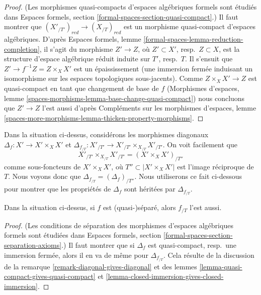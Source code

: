 \begin{proof}
(Les morphismes quasi-compacts d'espaces algébriques formels sont étudiés dans
Espaces formels, section \ref{formal-spaces-section-quasi-compact}.)
Il faut montrer que $(X'_{/T'})_{red} \to (X_{/T})_{red}$ est un morphisme
quasi-compact d'espaces algébriques. D'après
Espaces formels, lemme \ref{formal-spaces-lemma-reduction-completion},
il s'agit du morphisme $Z' \to Z$, où $Z' \subset X'$, resp.\ $Z \subset X$,
est la structure d'espace algébrique réduit induite sur $T'$, resp.\ $T$.
Il s'ensuit que $Z' \to f^{-1}Z = Z \times_X X'$ est un épaississement
(une immersion fermée induisant un isomorphisme sur les espaces topologiques
sous-jacents). Comme $Z \times_X X' \to Z$ est quasi-compact en tant que
changement de base de $f$ (Morphismes d'espaces, lemme
\ref{spaces-morphisms-lemma-base-change-quasi-compact})
nous concluons que $Z' \to Z$ l'est aussi d'après
Compléments sur les morphismes d'espaces, lemme
\ref{spaces-more-morphisms-lemma-thicken-property-morphisms}.
\end{proof}

\begin{remark}
\label{remark-diagonal-gives-diagonal}
Dans la situation ci-dessus, considérons les morphismes diagonaux
$\Delta_f : X' \to X' \times_X X'$ et
$\Delta_{f_{/T}} : X'_{/T'} \to X'_{/T'} \times_{X_{/T}} X'_{/T'}$.
On voit facilement que
$$
X'_{/T'} \times_{X_{/T}} X'_{/T'} = (X' \times_X X')_{/T''}
$$
comme sous-foncteurs de $X' \times_X X'$, où $T'' \subset |X' \times_X X'|$
est l'image réciproque de $T$. Nous voyons donc que
$\Delta_{f_{/T}} = (\Delta_f)_{/T''}$. Nous utiliserons ce fait ci-dessous
pour montrer que les propriétés de $\Delta_f$ sont héritées par $\Delta_{f_{/T}}$.
\end{remark}

\begin{lemma}
\label{lemma-quasi-separated-gives-quasi-separated}
Dans la situation ci-dessus, si $f$ est (quasi-)séparé, alors
$f_{/T}$ l'est aussi.
\end{lemma}

\begin{proof}
(Les conditions de séparation des morphismes d'espaces algébriques formels
sont étudiées dans Espaces formels, section
\ref{formal-spaces-section-separation-axioms}.)
Il faut montrer que si $\Delta_f$ est quasi-compact, resp.\ une immersion
fermée, alors il en va de même pour $\Delta_{f_{/T}}$. Cela résulte de la
discussion de la remarque \ref{remark-diagonal-gives-diagonal} et des
lemmes \ref{lemma-quasi-compact-gives-quasi-compact} et
\ref{lemma-closed-immersion-gives-closed-immersion}.
\end{proof}

